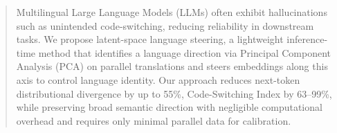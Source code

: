 \begin{abstract}
  Multilingual Large Language Models (LLMs) often exhibit hallucinations such as unintended code-switching, reducing reliability in downstream tasks.
  We propose latent-space language steering, a lightweight inference-time method that identifies a language direction via Principal Component Analysis (PCA) on parallel translations
  and steers embeddings along this axis to control language identity.
Our approach reduces next-token distributional divergence by up to 55\%, Code-Switching Index by 63--99\%, while preserving broad semantic direction with negligible computational overhead
and requires only minimal parallel data for calibration.
\end{abstract}

